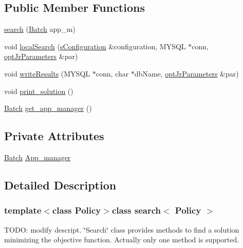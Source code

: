 \subsection*{Public Member Functions}
\begin{DoxyCompactItemize}
\item 
\hyperlink{classsearch_a68606af5b4adbb5d9f7df88f8ed06e2c}{search} (\hyperlink{classBatch}{Batch} app\-\_\-m)
\item 
void \hyperlink{classsearch_a43081dcb0553c48414c0e358323fecb2}{local\-Search} (\hyperlink{readConfigurationFile_8hh_ab8f35b1da3261263c5e9c0e7c8921f5c}{s\-Configuration} \&configuration, M\-Y\-S\-Q\-L $\ast$conn, \hyperlink{classoptJrParameters}{opt\-Jr\-Parameters} \&par)
\item 
void \hyperlink{classsearch_a5c2193a35a9e1be1b05c9499037b0b6f}{write\-Results} (M\-Y\-S\-Q\-L $\ast$conn, char $\ast$db\-Name, \hyperlink{classoptJrParameters}{opt\-Jr\-Parameters} \&par)
\item 
void \hyperlink{classsearch_a0cf02fb0b69c8049e56dfec561e47bf9}{print\-\_\-solution} ()
\item 
\hyperlink{classBatch}{Batch} \hyperlink{classsearch_aa499999582d9d2b6f193075953fc882a}{get\-\_\-app\-\_\-manager} ()
\end{DoxyCompactItemize}
\subsection*{Private Attributes}
\begin{DoxyCompactItemize}
\item 
\hyperlink{classBatch}{Batch} \hyperlink{classsearch_aa9b7922418788c7febf5aca7af407264}{App\-\_\-manager}
\end{DoxyCompactItemize}


\subsection{Detailed Description}
\subsubsection*{template$<$class Policy$>$class search$<$ Policy $>$}

T\-O\-D\-O\-: modify descript. \char`\"{}\-Search\char`\"{} class provides methods to find a solution minimizing the objective function. Actually only one method is supported. 

